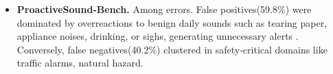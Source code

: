\documentclass{article}
\begin{document}
\begin{itemize}[leftmargin=0.5em,label=\textbullet,itemsep=0.35em,topsep=0.35em]
    \item \textbf{ProactiveSound-Bench.}
    Among errors. False positives(59.8\%) were dominated by overreactions to benign daily sounds such as tearing paper, appliance noises, drinking, or sighs, generating unnecessary alerts . Conversely, false negatives(40.2\%) clustered in safety‑critical domains like traffic alarms, natural hazard.

\end{itemize}













\newpage

\end{document}
